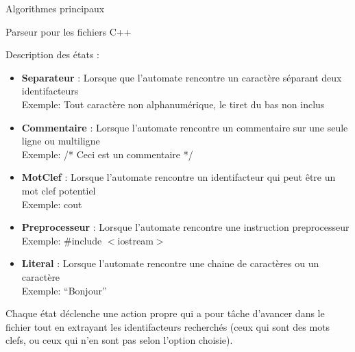 \documentclass{article}
\begin{document}
\begin{section}{Algorithmes principaux}
\begin{subsection}{Parseur pour les fichiers C++}
  \begin{paragraph}{Description des états :}
   \begin{itemize}
    \item \textbf{Separateur} : Lorsque que l'automate rencontre un caractère séparant deux identifacteurs\\Exemple: Tout caractère non alphanumérique, le tiret du bas non inclus
    \item \textbf{Commentaire} : Lorsque l'automate rencontre un commentaire sur une seule ligne ou multiligne \\Exemple: /* Ceci est un commentaire */
    \item \textbf{MotClef} : Lorsque l'automate rencontre un identifacteur qui peut être un mot clef potentiel \\Exemple: cout
    \item \textbf{Preprocesseur} : Lorsque l'automate rencontre une instruction preprocesseur \\Exemple: \#include $<$iostream$>$
    \item \textbf{Literal} : Lorsque l'automate rencontre une chaine de caractères ou un caractère\\Exemple: ``Bonjour''\\
   \end{itemize}
  \end{paragraph}
  
  Chaque état déclenche une action propre qui a pour tâche d'avancer dans le fichier tout en extrayant les identifacteurs recherchés
(ceux qui sont des mots clefs, ou ceux qui n'en sont pas selon l'option choisie).
  \end{subsection}

\end{section}
\end{document}
